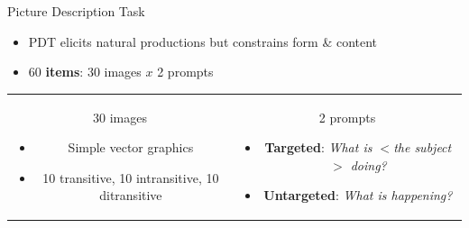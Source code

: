\documentclass[final,t]{beamer}
\begin{document}
\begin{frame}{}
\begin{columns}[t]
\begin{column}{.33\linewidth}
\begin{block}{Picture Description Task}
\begin{center}
\begin{minipage}{.85\textwidth}

  \vspace{-.38em}
  \begin{itemize}
  \item{PDT elicits natural productions but constrains form \& content}
  \item{60 \textbf{items}: 30 images $x$ 2 prompts}
  \end{itemize}
  \begin{tabular}{cc}
    \begin{minipage}{.48\textwidth}
      \begin{center}
        \vspace{1ex}
        30 images
      \end{center}
        \vspace{-1ex}
    \begin{itemize}
    \item Simple vector graphics
    \item 10 transitive, 10 intransitive, 10 ditransitive
    \end{itemize}
    \end{minipage}
    & 
    \begin{minipage}{.47\textwidth}
      \begin{center}
        \vspace{1ex}
        2 prompts
      \end{center}
        \vspace{-1ex}
    \begin{itemize}
    \item \textbf{Targeted}: \textit{What is $<$the subject$>$ doing?}
    \item \textbf{Untargeted}: \textit{What is happening?}
    \end{itemize}
    \end{minipage}
    \\
  \end{tabular}


\end{minipage}
\end{center}
\end{block}
\end{column}
\end{columns}
\end{frame}
\end{document}
